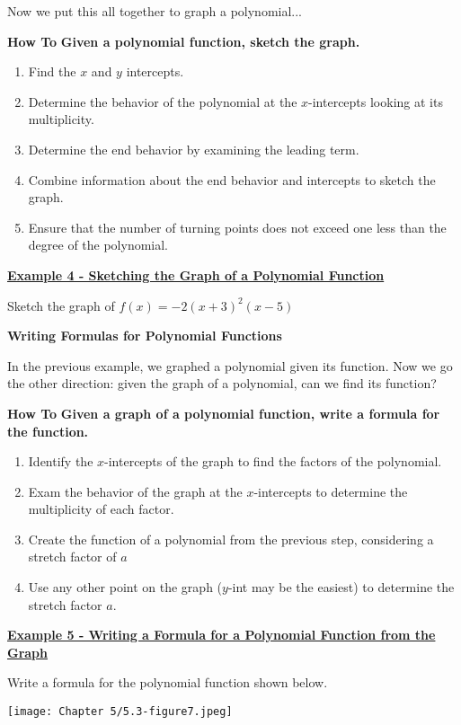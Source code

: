 \documentclass[12pt]{book}
\begin{document}
Now we put this all together to graph a polynomial...

\newpage

\begin{boxR}
    \textbf{How To}
    \vspace{1mm}
    \hline
    \vspace{2mm}
    \textbf{Given a polynomial function, sketch the graph.}
    \begin{enumerate}
        \item Find the $x$ and $y$ intercepts. 
        \item Determine the behavior of the polynomial at the $x$-intercepts looking at its multiplicity.
        \item Determine the end behavior by examining the leading term.
        \item Combine information about the end behavior and intercepts to sketch the graph.
        \item Ensure that the number of turning points does not exceed one less than the degree of the polynomial.
    \end{enumerate}
\end{boxR}

\vspace{5mm}

\underline{\textbf{Example 4 - Sketching the Graph of a Polynomial Function}}

Sketch the graph of $f(x)=-2(x+3)^2(x-5)$


\newpage

{\large \textbf{Writing Formulas for Polynomial Functions}}

In the previous example, we graphed a polynomial given its function. Now we go the other direction: given the graph of a polynomial, can we find its function?
\bigskip

\begin{boxR}
\textbf{How To}
\vspace{1mm}
\hline
\vspace{2mm}
\textbf{Given a graph of a polynomial function, write a formula for the function.}
\begin{enumerate}
    \item Identify the $x$-intercepts of the graph to find the factors of the polynomial.
    \item Exam the behavior of the graph at the $x$-intercepts to determine the multiplicity of each factor. 
    \item Create the function of a polynomial from the previous step, considering a stretch factor of $a$
    \item Use any other point on the graph ($y$-int may be the easiest) to determine the stretch factor $a$.
\end{enumerate}
\end{boxR}


\underline{\textbf{Example 5 - Writing a Formula for a Polynomial Function from the Graph}}

Write a formula for the polynomial function shown below. 

\texttt{[image: Chapter 5/5.3-figure7.jpeg]}
\end{document}
